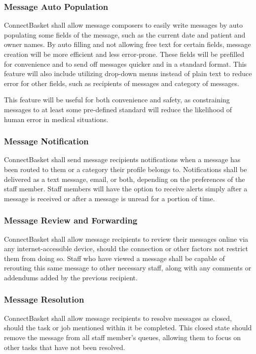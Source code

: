 \documentclass[onecolumn, draftclsnofoot,10pt, compsoc]{IEEEtran}
\begin{document}
\subsubsection{Message Auto Population}
ConnectBasket shall allow message composers to easily write messages by auto populating some fields of the message, such as the current date and patient and owner names. By auto filling and not allowing free text for certain fields, message creation will be more efficient and less error-prone. These fields will be prefilled for convenience and to send off messages quicker and in a standard format. This feature will also include utilizing drop-down menus instead of plain text to reduce error for other fields, such as recipients of messages and category of messages.

This feature will be useful for both convenience and safety, as constraining messages to at least some pre-defined standard will reduce the likelihood of human error in medical situations.

\subsubsection{Message Notification}
ConnectBasket shall send message recipients notifications when a message has been routed to them or a category their profile belongs to. Notifications shall be delivered as a text message, email, or both, depending on the preferences of the staff member. Staff members will have the option to receive alerts simply after a message is received or after a message is unread for a portion of time.

\subsubsection{Message Review and Forwarding}
ConnectBasket shall allow message recipients to review their messages online via any internet-accessible device, should the connection or other factors not restrict them from doing so. Staff who have viewed a message shall be capable of rerouting this same message to other necessary staff, along with any comments or addendums added by the previous recipient. 

\subsubsection{Message Resolution}
ConnectBasket shall allow message recipients to resolve messages as closed, should the task or job mentioned within it be completed. This closed state should remove the message from all staff member's queues, allowing them to focus on other tasks that have not been resolved.
	
\end{document}

